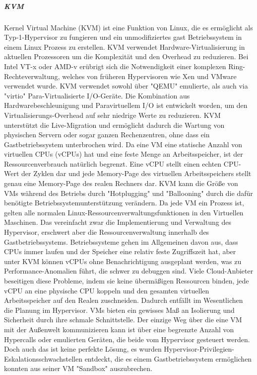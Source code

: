 \subparagraph{KVM}
Kernel Virtual Machine (KVM) ist eine Funktion von Linux, die es ermöglicht als Typ-1-Hypervisor zu fungieren und ein unmodifiziertes gast Betriebssystem in einem Linux Prozess zu erstellen. KVM verwendet Hardware-Virtualisierung in aktuellen Prozessoren um die Komplexität und den Overhead zu reduzieren. Bei Intel VT-x oder AMD-v erübrigt sich die Notwendigkeit einer komplexen Ring-Rechteverwaltung, welches von früheren Hypervisoren wie Xen und VMware verwendet wurde. KVM verwendet sowohl über "QEMU\cite{QEMUEmulator}" emulierte, als auch via "virtio\cite{View2018VirtioVirtio}" Para-Virtualisierte I/O-Geräte. Die Kombination aus Hardwarebeschleunigung und Paravirtuellem I/O ist entwickelt worden, um den Virtualisierungs-Overhead auf sehr niedrige Werte zu reduzieren. KVM unterstützt die Live-Migration und ermöglicht dadurch die Wartung von physischen Servern oder sogar ganzen Rechenzentren, ohne dass ein Gastbetriebssystem unterbrochen wird. Da eine VM eine statische Anzahl von virtuellen CPUs (vCPUs) hat und eine feste Menge an Arbeitsspeicher, ist der Ressourcenverbrauch natürlich begrenzt. Eine vCPU stellt einen echten CPU-Wert der Zyklen dar und jede Memory-Page des virtuellen Arbeitsspeichers stellt genau eine Memory-Page des realen Rechners dar. KVM kann die Größe von VMs während des Betriebs durch "Hotplugging" und "Ballooning" durch die dafür benötigte Betriebssystemunterstützung verändern. Da jede VM ein Prozess ist, gelten alle normalen Linux-Ressourcenverwaltungsfunktionen in den Virtuellen Maschinen. Das vereinfacht zwar die Implementierung und Verwaltung des Hypervisor, erschwert aber die Ressourcenverwaltung innerhalb des Gastbetriebssystems. Betriebssysteme gehen im Allgemeinen davon aus, dass CPUs immer laufen und der Speicher eine relativ feste Zugriffszeit hat, aber unter KVM können vCPUs ohne Benachrichtigung ausgeplant werden, was zu Performance-Anomalien führt, die schwer zu debuggen sind. Viele Cloud-Anbieter beseitigen diese Probleme, indem sie keine übermäßigen Ressourcen binden, jede vCPU an eine physische CPU koppeln und den gesamten virtuellen Arbeitsspeicher auf den Realen zuschneiden. Dadurch entfällt im Wesentlichen die Planung im Hypervisor. VMs bieten ein gewisses Maß an Isolierung und Sicherheit durch ihre schmale Schnittstelle. Der einzige Weg über die eine VM mit der Außenwelt kommunizieren kann ist über eine begrenzte Anzahl von Hypercalls oder emulierten Geräten, die beide vom Hypervisor gesteuert werden. Doch auch das ist keine perfekte Lösung, es wurden Hypervisor-Privilegien-Eskalationsschwachstellen entdeckt, die es einem Gastbetriebssystem ermöglichen konnten aus seiner VM "Sandbox" auszubrechen\cite{Felter2014IBMContainers}.

